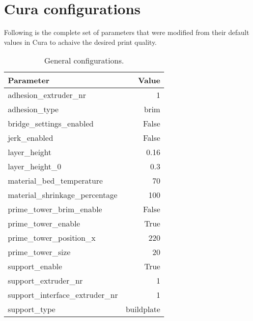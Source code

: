 \section{Cura configurations}
Following is the complete set of parameters that were modified from their default values in Cura to achaive the desired print quality.
\begin{table}[H]
    \centering
    \scriptsize
    \begin{tabular}{ |l|r| }
        \hline
        \textbf{Parameter}               & \textbf{Value} \\
        \hline
        adhesion\_extruder\_nr           & 1              \\
        adhesion\_type                   & brim           \\
        bridge\_settings\_enabled        & False          \\
        jerk\_enabled                    & False          \\
        layer\_height                    & 0.16           \\
        layer\_height\_0                 & 0.3            \\
        material\_bed\_temperature       & 70             \\
        material\_shrinkage\_percentage  & 100            \\
        prime\_tower\_brim\_enable       & False          \\
        prime\_tower\_enable             & True           \\
        prime\_tower\_position\_x        & 220            \\
        prime\_tower\_size               & 20             \\
        support\_enable                  & True           \\
        support\_extruder\_nr            & 1              \\
        support\_interface\_extruder\_nr & 1              \\
        support\_type                    & buildplate     \\
        \hline
    \end{tabular}
    \caption{General configurations.}
\end{table}
\pagebreak
